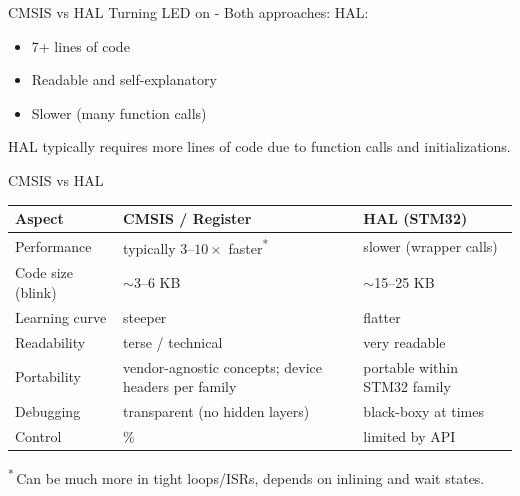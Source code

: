 \documentclass{beamer}
\begin{document}
\begin{frame}{CMSIS vs HAL}
	{Turning LED on - Both approaches:}
	HAL:
	\begin{itemize}
		\item 7+ lines of code
		\item Readable and self-explanatory
		\item Slower (many function calls)
	\end{itemize}
	\vspace{0.2cm}
	HAL typically requires more lines of code due to function calls and initializations.
\end{frame}
\begin{frame}{CMSIS vs HAL}
	\small
	\begin{tabularx}{\linewidth}{@{} l >{\raggedright\arraybackslash}X >{\raggedright\arraybackslash}X @{}}
		\toprule
		\textbf{Aspect} & \textbf{CMSIS / Register} & \textbf{HAL (STM32)} \\
		\midrule
		Performance & typically $3$--$10\times$ faster\textsuperscript{*} & slower (wrapper calls) \\
		Code size (blink) & $\sim$3--6 KB & $\sim$15--25 KB \\
		Learning curve & steeper & flatter \\
		Readability & terse / technical & very readable \\
		Portability & vendor-agnostic concepts; device headers per family & portable within STM32 family \\
		Debugging & transparent (no hidden layers) & black-boxy at times \\
		Control & 100\% & limited by API \\
		\bottomrule
	\end{tabularx}
	
	\medskip
	{\footnotesize\textsuperscript{*}\,Can be much more in tight loops/ISRs, depends on inlining and wait states.}
\end{frame}
\end{document}
